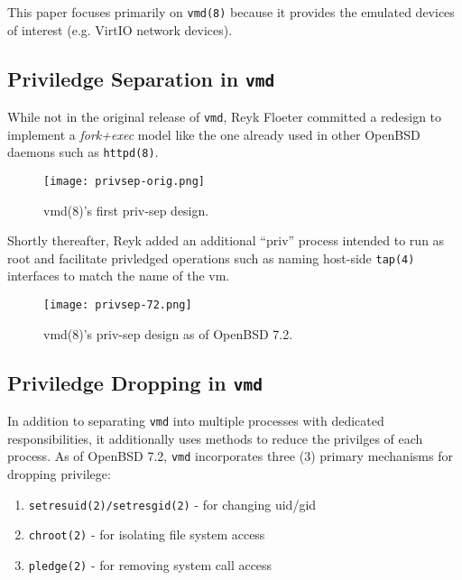 \documentclass[conference]{IEEEtran}
\begin{document}
This paper focuses primarily on \texttt{vmd(8)} because it provides
the emulated devices of interest (e.g. VirtIO network devices).

\vspace{3mm}
\subsection{Priviledge Separation in \texttt{vmd}}
While not in the original release of \texttt{vmd}, Reyk Floeter
committed \cite{b6} a redesign to implement a \emph{fork+exec} model
like the one already used in other OpenBSD daemons such as
\texttt{httpd(8)}.

\vspace{2mm}
\begin{figure}
  \texttt{[image: privsep-orig.png]}
  \caption{vmd(8)'s first priv-sep design.}
\end{figure}
\vspace{2mm}

Shortly thereafter, Reyk added \cite{b7} an additional ``priv''
process intended to run as root and facilitate privledged operations
such as naming host-side \texttt{tap(4)} interfaces to match the name
of the vm.

\vspace{2mm}
\begin{figure}
  \texttt{[image: privsep-72.png]}
  \caption{vmd(8)'s priv-sep design as of OpenBSD 7.2.}
\end{figure}
\vspace{2mm}


\vspace{3mm}
\subsection{Priviledge Dropping in \texttt{vmd}}
In addition to separating \texttt{vmd} into multiple processes with
dedicated responsibilities, it additionally uses methods to reduce the
privilges of each process. As of OpenBSD 7.2, \texttt{vmd}
incorporates three (3) primary mechanisms for dropping privilege:

\vspace{2mm}
\begin{enumerate}
\item \texttt{setresuid(2)/setresgid(2)} - for changing uid/gid
\item \texttt{chroot(2)} - for isolating file system access
\item \texttt{pledge(2)} - for removing system call access
\end{enumerate}
\vspace{2mm}
\end{document}
